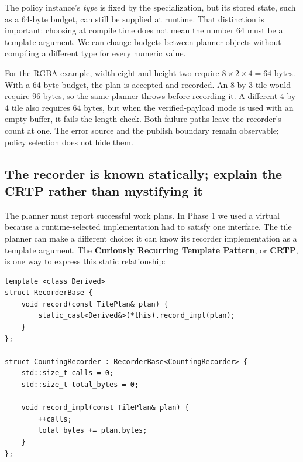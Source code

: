 The policy instance's \emph{type} is fixed by the specialization, but its stored state, such as a 64-byte budget, can still be supplied at runtime. That distinction is important: choosing  at compile time does not mean the number 64 must be a template argument. We can change budgets between planner objects without compiling a different type for every numeric value.

For the RGBA example, width eight and height two require \(8\times2\times4=64\) bytes. With a 64-byte budget, the plan is accepted and recorded. An 8-by-3 tile would require 96 bytes, so the same planner throws before recording it. A different 4-by-4 tile also requires 64 bytes, but when the verified-payload mode is used with an empty buffer, it fails the length check. Both failure paths leave the recorder's count at one. The error source and the publish boundary remain observable; policy selection does not hide them.

\subsection{The recorder is known statically; explain the CRTP rather than mystifying it}\label{05-engine-i-ch005-the-recorder-is-known-statically-explain-the-crtp-rather-than-mystifying-it}

\hypertarget{05-engine-i-ch005-the-recorder-is-known-statically-explain-the-crtp-rather-than-mystifying-it}{}

The planner must report successful work plans. In Phase 1 we used a virtual  because a runtime-selected implementation had to satisfy one interface. The tile planner can make a different choice: it can know its recorder implementation as a template argument. The \textbf{Curiously Recurring Template Pattern}, or \textbf{CRTP}, is one way to express this static relationship:

\begin{verbatim}
template <class Derived>
struct RecorderBase {
    void record(const TilePlan& plan) {
        static_cast<Derived&>(*this).record_impl(plan);
    }
};

struct CountingRecorder : RecorderBase<CountingRecorder> {
    std::size_t calls = 0;
    std::size_t total_bytes = 0;

    void record_impl(const TilePlan& plan) {
        ++calls;
        total_bytes += plan.bytes;
    }
};
\end{verbatim}

